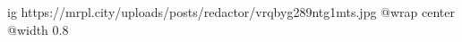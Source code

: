  
 
 
 
 

\ifcmt
  ig https://mrpl.city/uploads/posts/redactor/vrqbyg289ntg1mts.jpg
  @wrap center
  @width 0.8
\fi
